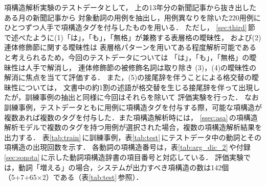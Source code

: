 項構造解析実験のテストデータとして，
上の13年分の新聞記事から抜き出したある月の新聞記事から
対象動詞の用例を抽出し，用例異なりを除いた220用例にひとつずつ人手で項構造タグを付与したものを用いる．
ただし，
\ref{sec:third}\,節で述べたように(1)「は」，「も」，「無格」が兼務する表層格の曖昧性，
および(2)連体修飾節に関する曖昧性は
表層格パターンを用いてある程度解析可能であると考えられるため，今回のテストデータについては
「は」，「も」，「無格」の曖昧性は人手で解消し，
連体修飾節の被修飾名詞は取り除き
(3)，(4)の曖昧性の解消に焦点を当てて評価する．
また，(5)の接尾辞を伴うことによる格交替の曖昧性については，
文書中の約1割の述語が格交替を生じる接尾辞を伴って出現したが，訓練事例の抽出と同様に今回はそれらを除いて
評価実験を行った．
なお訓練事例，テストデータともに用例に項構造タグを付与する際，可能な項構造が複数あれば複数のタグを付与した．また項構造解析時には，
\ref{ssec:asa}\,の項構造解析モデルで複数のタグを持つ用例が選択された場合，複数の項構造解析結果を出力する．
表\ref{tab:train}\,に訓練事例，表\ref{tab:test}\,にテストデータ中の動詞とその項構造の出現回数を示す．
各動詞の項構造番号は，表\ref{tab:arg_dic_2}\,や付録\ref{sec:sonota}\,に示した動詞項構造辞書の項目番号と対応している．
評価実験では，動詞「増える」の場合，システムが出力すべき項構造の数は142個（5+7+65×2）である（表\ref{tab:test}\,参照）．

